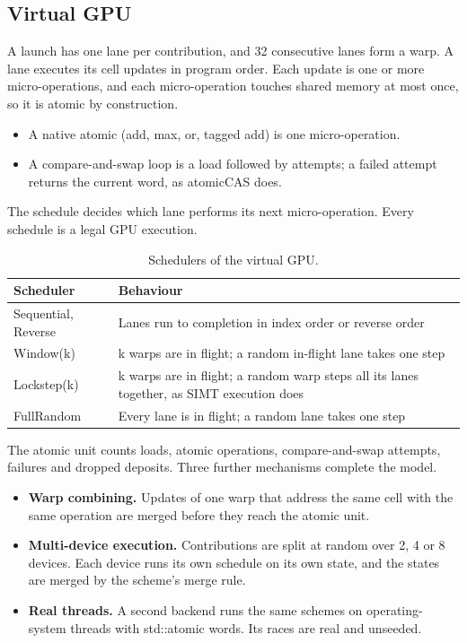 \documentclass[3p,10pt]{elsarticle}
\begin{document}
\hypertarget{virtual-gpu}{%
\subsection{Virtual GPU}\label{virtual-gpu}}

A launch has one lane per contribution, and 32 consecutive lanes form a
warp. A lane executes its cell updates in program order. Each update is
one or more micro-operations, and each micro-operation touches shared
memory at most once, so it is atomic by construction.

\begin{itemize}
\item
  A native atomic (add, max, or, tagged add) is one micro-operation.
\item
  A compare-and-swap loop is a load followed by attempts; a failed
  attempt returns the current word, as atomicCAS does.
\end{itemize}

The schedule decides which lane performs its next micro-operation. Every
schedule is a legal GPU execution.

\begin{table}[!htbp]\centering\small\setlength{\tabcolsep}{4pt}
\caption{Schedulers of the virtual GPU.}\label{tab:7}
\begin{tabularx}{\linewidth}{>{\raggedright\arraybackslash\hsize=0.667\hsize}X>{\raggedright\arraybackslash\hsize=1.333\hsize}X}
\toprule
Scheduler & Behaviour \\
\midrule
Sequential, Reverse & Lanes run to completion in index order or reverse order \\
Window(k) & k warps are in flight; a random in-flight lane takes one step \\
Lockstep(k) & k warps are in flight; a random warp steps all its lanes together, as
SIMT execution does \\
FullRandom & Every lane is in flight; a random lane takes one step \\
\bottomrule
\end{tabularx}
\end{table}

The atomic unit counts loads, atomic operations, compare-and-swap
attempts, failures and dropped deposits. Three further mechanisms
complete the model.

\begin{itemize}
\item
  \textbf{Warp combining.} Updates of one warp that address the same
  cell with the same operation are merged before they reach the atomic
  unit.
\item
  \textbf{Multi-device execution.} Contributions are split at random
  over 2, 4 or 8 devices. Each device runs its own schedule on its own
  state, and the states are merged by the scheme's merge rule.
\item
  \textbf{Real threads.} A second backend runs the same schemes on
  operating-system threads with std::atomic words. Its races are real
  and unseeded.
\end{itemize}
\end{document}
